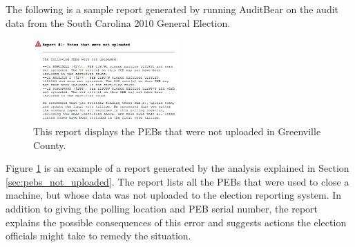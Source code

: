 \smvertspace

The following is a sample report generated by running AuditBear on the
audit data from the South Carolina 2010 General Election. 

\begin{figure}[h]
\caption{This report displays the PEBs that were not uploaded in Greenville County.}
\centering
  \label{fig:sample2}
    \includegraphics[width=0.5\textwidth]{sample3}
\end{figure}

Figure
\ref{fig:sample2} is an example of a report generated by the analysis
explained in Section \ref{sec:pebs_not_uploaded}. The report lists all
the PEBs that were used to close a machine, but whose data was not
uploaded to the election reporting 
system. In addition to giving the polling location and PEB serial
number, the report explains the possible consequences of this
error and suggests actions the election officials might take to
remedy the situation.


